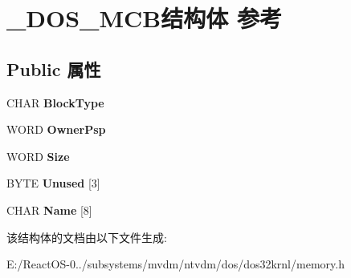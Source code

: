 \hypertarget{struct___d_o_s___m_c_b}{}\section{\+\_\+\+D\+O\+S\+\_\+\+M\+C\+B结构体 参考}
\label{struct___d_o_s___m_c_b}
\subsection*{Public 属性}
\begin{DoxyCompactItemize}
\item 
\mbox{\label{struct___d_o_s___m_c_b_a165232c63b913df675d5f2aa22598f68}} 
C\+H\+AR {\bfseries Block\+Type}
\item 
\mbox{\label{struct___d_o_s___m_c_b_af958517ea3f7e11959899ad146531ea3}} 
W\+O\+RD {\bfseries Owner\+Psp}
\item 
\mbox{\label{struct___d_o_s___m_c_b_a3eb2b72d223ee9267af82e6c980701f4}} 
W\+O\+RD {\bfseries Size}
\item 
\mbox{\label{struct___d_o_s___m_c_b_a5c7102de2b267e189656208fe5dfda56}} 
B\+Y\+TE {\bfseries Unused} \mbox{[}3\mbox{]}
\item 
\mbox{\label{struct___d_o_s___m_c_b_a50fc6f33656333fb4574603d8737b5b2}} 
C\+H\+AR {\bfseries Name} \mbox{[}8\mbox{]}
\end{DoxyCompactItemize}


该结构体的文档由以下文件生成\+:\begin{DoxyCompactItemize}
\item 
E\+:/\+React\+O\+S-\/0../subsystems/mvdm/ntvdm/dos/dos32krnl/memory.\+h\end{DoxyCompactItemize}
